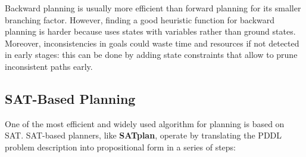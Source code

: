 \documentclass{article}
\begin{document}
Backward planning is usually more efficient than forward planning for its smaller branching factor. However, finding a good heuristic function for backward planning is harder because uses states with variables rather than ground states. Moreover, inconsistencies in goals could waste time and resources if not detected in early stages: this can be done by adding state constraints that allow to prune inconsistent paths early.

\subsection{SAT-Based Planning}
One of the most efficient and widely used algorithm for planning is based on SAT. SAT-based planners, like \textbf{SATplan}, operate by translating the PDDL problem description into propositional form in a series of steps:
\end{document}
